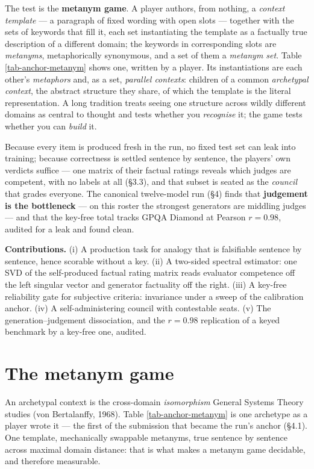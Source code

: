 \documentclass{article}
\begin{document}
The test is the \textbf{metanym game}. A player authors, from nothing, a \emph{context template} --- a paragraph of fixed wording with open slots --- together with the sets of keywords that fill it, each set instantiating the template as a factually true description of a different domain; the keywords in corresponding slots are \emph{metanyms}, metaphorically synonymous, and a set of them a \emph{metanym set}. Table \ref{tab-anchor-metanym} shows one, written by a player. Its instantiations are each other's \emph{metaphors} and, as a set, \emph{parallel contexts}: children of a common \emph{archetypal context}, the abstract structure they share, of which the template is the literal representation. A long tradition treats seeing one structure across wildly different domains as central to thought and tests whether you \emph{recognise} it; the game tests whether you can \emph{build} it.

Because every item is produced fresh in the run, no fixed test set can leak into training; because correctness is settled sentence by sentence, the players' own verdicts suffice --- one matrix of their factual ratings reveals which judges are competent, with no labels at all (\S{}3.3), and that subset is seated as the \emph{council} that grades everyone. The canonical twelve-model run (\S{}4) finds that \textbf{judgement is the bottleneck} --- on this roster the strongest generators are middling judges --- and that the key-free total tracks GPQA Diamond at Pearson \(r = 0.98\), audited for a leak and found clean.

\textbf{Contributions.} (i) A production task for analogy that is falsifiable sentence by sentence, hence scorable without a key. (ii) A two-sided spectral estimator: one SVD of the self-produced factual rating matrix reads evaluator competence off the left singular vector and generator factuality off the right. (iii) A key-free reliability gate for subjective criteria: invariance under a sweep of the calibration anchor. (iv) A self-administering council with contestable seats. (v) The generation--judgement dissociation, and the \(r = 0.98\) replication of a keyed benchmark by a key-free one, audited.

\section{The metanym game}\label{the-metanym-game}

An archetypal context is the cross-domain \emph{isomorphism} General Systems Theory studies (von Bertalanffy, 1968). Table \ref{tab-anchor-metanym} is one archetype as a player wrote it --- the first of the submission that became the run's anchor (\S{}4.1). One template, mechanically swappable metanyms, true sentence by sentence across maximal domain distance: that is what makes a metanym game decidable, and therefore measurable.
\end{document}
